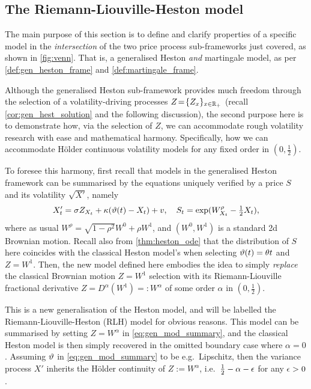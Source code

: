 \subsection{The Riemann-Liouville-Heston model}\label{sec:RLH_model}

The main purpose of this section is to define and clarify properties of a specific model in the \emph{intersection} of the two price process sub-frameworks just covered, as shown in \autoref{fig:venn}. That is, a generalised Heston \emph{and} martingale model, as per \autoref{def:gen_heston_frame} and \autoref{def:martingale_frame}.

Although the generalised Heston sub-framework provides much freedom through the selection of a volatility-driving processes $Z\!=\!\{Z_x\}_{x\in\mathbb{R}_+}$ (recall \autoref{cor:gen_hest_solution} and the following discussion), the second purpose here is to demonstrate how, via the selection of $Z$, we can accommodate rough volatility research with ease and mathematical harmony. Specifically, how we can accommodate H\"older continuous volatility models for any fixed order in $(0,\frac12)$.

To foresee this harmony, first recall that models in the generalised Heston framework can be summarised by the equations uniquely verified by a price $S$ and its volatility $\sqrt{X'}$, namely
\begin{equation}\label{eq:gen_mod_summary}
    X'_t = \sigma Z_{X_t} + \kappa(\vartheta(t) - X_t) + v,\quad S_t=\exp(W^\rho_{X_t}-\tfrac12 X_t),
\end{equation}
where as usual $W^\rho=\sqrt{1-\rho^2}W^0+ \rho W^1$, and $(W^0,W^1)$ is a standard 2d Brownian motion. Recall also from \autoref{thm:heston_ode} that the distribution of $S$ here coincides with the classical Heston model's when selecting $\vartheta(t) = \theta t$ and $Z=W^1$. Then, the new model defined here embodies the idea to simply \emph{replace} the classical Brownian motion $Z=W^1$ selection with its Riemann-Liouville fractional derivative $Z=D^\alpha(W^1)=:W^{\alpha}$ of some order $\alpha$ in $(0,\frac12)$.

This is a new generalisation of the Heston model, and will be labelled the Riemann-Liouville-Heston (RLH) model for obvious reasons. This model can be summarised by setting $Z=W^{\alpha}$ in \autoref{eq:gen_mod_summary}, and the classical Heston model is then simply recovered in the omitted boundary case where $\alpha=0$. Assuming $\vartheta$ in \autoref{eq:gen_mod_summary} to be e.g.~Lipschitz, then the variance process $X'$ inherits the H\"older continuity of $Z:=W^\alpha$, i.e.~$\frac12-\alpha-\epsilon$ for any $\epsilon>0$.

